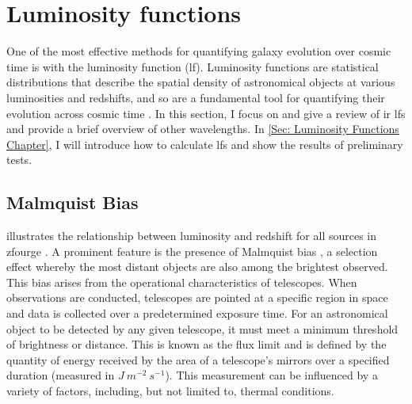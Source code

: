 \section{Luminosity functions}
One of the most effective methods for quantifying galaxy evolution over cosmic time is with the luminosity function (\gls{lf}). Luminosity functions are statistical distributions that describe the spatial density of astronomical objects at various luminosities and redshifts, and so are a fundamental tool for quantifying their evolution across cosmic time \citep{han_evolution_2012, dai_mid-infrared_2009, wylezalek_galaxy_2014}. In this section, I focus on and give a review of \gls{ir} \gls{lf}s and provide a brief overview of other wavelengths. In \cref{Sec: Luminosity Functions Chapter}, I will introduce how to calculate \gls{lf}s and show the results of preliminary tests. 

\subsection{Malmquist Bias}

 illustrates the relationship between luminosity and redshift for all sources in \gls{zfourge} \citep{straatman_fourstar_2016}. A prominent feature is the presence of Malmquist bias \citep{malmquist_relations_1922}, a selection effect whereby the most distant objects are also among the brightest observed. This bias arises from the operational characteristics of telescopes. When observations are conducted, telescopes are pointed at a specific region in space and data is collected over a predetermined exposure time. For an astronomical object to be detected by any given telescope, it must meet a minimum threshold of brightness or distance. This is known as the flux limit and is defined by the quantity of energy received by the area of a telescope's mirrors over a specified duration (measured in $J \ m^{-2} \ s^{-1}$). This measurement can be influenced by a variety of factors, including, but not limited to, thermal conditions.

